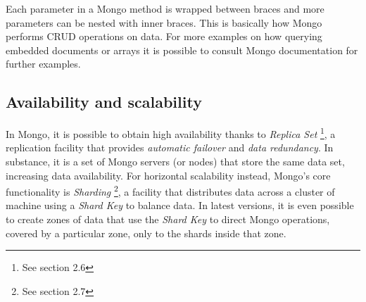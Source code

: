Each parameter in a Mongo method is wrapped between {} braces and more parameters can be nested with inner {} braces. 
This is basically how Mongo performs CRUD operations on data. For more examples on how querying embedded documents or arrays it is possible to consult Mongo documentation for further examples.

\subsection {Availability and scalability}
In Mongo, it is possible to obtain high availability thanks to \textit{Replica Set} \footnote{See section 2.6}, a replication facility that provides \textit{automatic failover} and \textit{data redundancy}. In substance, it is a set of Mongo servers (or nodes) that store the same data set, increasing data availability.
For horizontal scalability instead, Mongo’s core functionality is \textit{Sharding} \footnote{See section 2.7}, a facility that distributes data across a cluster of machine using a \textit{Shard Key} to balance data. In latest versions, it is even possible to create zones of data that use the \textit{Shard Key} to direct Mongo operations, covered by a particular zone, only to the shards inside that zone.

